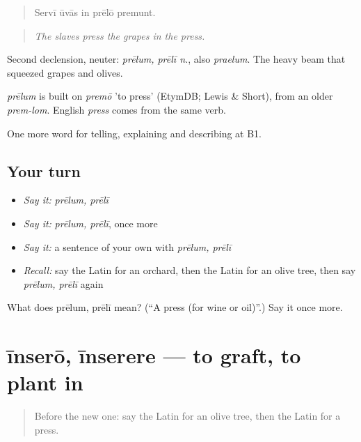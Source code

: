 \begin{quote}
Servī ūvās in prēlō premunt.
\end{quote}

\begin{quote}
\emph{The slaves press the grapes in the press.}
\end{quote}

Second declension, neuter: \emph{prēlum, prēlī n.}, also \emph{praelum}. The heavy beam that squeezed grapes and olives.

\begin{cousinweb}
\emph{prēlum} is built on \emph{premō} 'to press' (EtymDB; Lewis \& Short), from an older \emph{prem-lom}. English \emph{press} comes from the same verb.
\end{cousinweb}

\begin{grammarlens}[title={What you've built}]
One more word for telling, explaining and describing at B1.
\end{grammarlens}

\subsection*{Your turn}
\begin{itemize}
\raggedright
  \item \emph{Say it:} \emph{prēlum, prēlī}
  \item \emph{Say it:} \emph{prēlum, prēlī}, once more
  \item \emph{Say it:} a sentence of your own with \emph{prēlum, prēlī}
  \item \emph{Recall:} say the Latin for an orchard, then the Latin for an olive tree, then say \emph{prēlum, prēlī} again
\end{itemize}

\begin{tcolorbox}[breakable,colback=teal!4,colframe=teal!35!black,title={Before you move on}]
What does prēlum, prēlī mean? (\textquotedblleft{}A press (for wine or oil)\textquotedblright{}.) Say it once more.
\end{tcolorbox}
\section[īnserō, īnserere]{īnserō, īnserere — to graft, to plant in}

\label{lesson:LA-C479-insero}



\begin{quote}
Before the new one: say the Latin for an olive tree, then the Latin for a press.
\end{quote}

